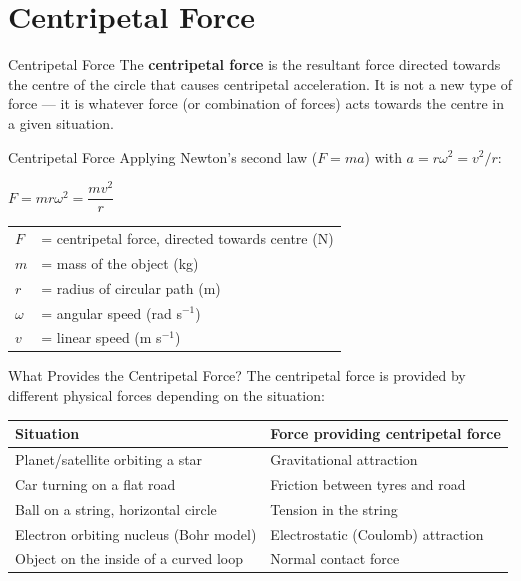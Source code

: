 \section{Centripetal Force}

\begin{definitionbox}{Centripetal Force}
The \textbf{centripetal force} is the resultant force directed towards the centre of the circle that causes centripetal acceleration. It is not a new type of force — it is whatever force (or combination of forces) acts towards the centre in a given situation.
\end{definitionbox}

\begin{formulabox}{Centripetal Force}
Applying Newton's second law ($F = ma$) with $a = r\omega^2 = v^2/r$:
\begin{center}
\Large $F = mr\omega^2 = \dfrac{mv^2}{r}$
\end{center}
\vspace{0.3em}
\begin{tabular}{@{}ll@{}}
$F$ & = centripetal force, directed towards centre (N) \\
$m$ & = mass of the object (kg) \\
$r$ & = radius of circular path (m) \\
$\omega$ & = angular speed (rad s$^{-1}$) \\
$v$ & = linear speed (m s$^{-1}$) \\
\end{tabular}
\end{formulabox}

\begin{keybox}{What Provides the Centripetal Force?}
The centripetal force is provided by different physical forces depending on the situation:
\renewcommand{\arraystretch}{1.4}
\begin{tabular}{@{}p{5.5cm} p{6cm}@{}}
\textbf{Situation} & \textbf{Force providing centripetal force} \\
\hline
Planet/satellite orbiting a star & Gravitational attraction \\
Car turning on a flat road & Friction between tyres and road \\
Ball on a string, horizontal circle & Tension in the string \\
Electron orbiting nucleus (Bohr model) & Electrostatic (Coulomb) attraction \\
Object on the inside of a curved loop & Normal contact force \\
\end{tabular}
\end{keybox}

